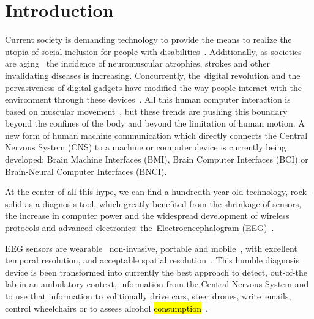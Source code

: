 \documentclass[brainsci,article,accept,moreauthors,pdftex,10pt,a4paper]{mdpi}
\begin{document}


\section{Introduction}






Current society is demanding technology to provide the means to realize the utopia of social inclusion for people with disabilities~\citep{Wolpaw2002}.  Additionally, as societies are aging~\citep{Lutz2008} the incidence of neuromuscular atrophies, strokes and other invalidating diseases is increasing.  Concurrently, the~digital revolution and the pervasiveness of digital gadgets have modified the way people interact with the environment through these devices~\citep{Domingo2012}.  All this human computer interaction is based on muscular movement~\citep{Guger2017}, but these trends are pushing this boundary beyond the confines of the body and beyond the limitation of human motion.  A new form of human machine communication which directly connects the Central Nervous System (CNS) to a machine or computer device is currently being developed: Brain Machine Interfaces (BMI), Brain Computer Interfaces (BCI) or Brain-Neural Computer Interfaces (BNCI).

At the center of all this hype, we can find a hundredth year old technology, rock-solid as a diagnosis tool, which greatly benefited from the shrinkage of sensors, the increase in computer power and the widespread development of wireless protocols and advanced electronics: the~Electroencephalogram (EEG)~\citep{Schomer2010}.

EEG sensors are wearable~\citep{Puce2017} non-invasive, portable and mobile~\citep{DeVos2014}, with excellent temporal resolution, and acceptable spatial resolution~\citep{Hartman2005}.  This humble diagnosis device is been transformed into currently the best approach to detect, out-of-the lab in an ambulatory context, information from the Central Nervous System and to use that information to volitionally drive cars, steer drones, write~emails, control wheelchairs or to assess alcohol \hl{consumption}~\citep{Yuste2017,KevricJasmin2016,Tzimourta2018,Cruz2018}.%
\end{document}
